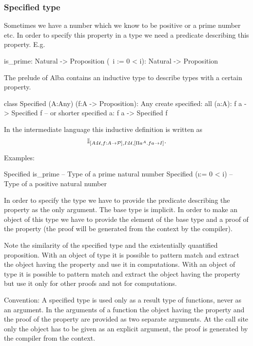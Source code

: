 \subsubsection{Specified type}


Sometimes we have a number which we know to be positive or a prime number
etc. In order to specify this property in a type we need a predicate
describing this property. E.g.

\begin{alba}
  is_prime:       Natural -> Proposition
  (\ i := 0 < i): Natural -> Proposition
\end{alba}

The prelude of Alba contains an inductive type to describe types with a
certain property.

\begin{alba}
  class
    Specified (A:Any) (f:A -> Proposition): Any
  create
    specified: all (a:A): f a -> Specified f
    -- or shorter
    specified a: f a -> Specified f
\end{alba}

In the intermediate language this inductive definition is written as
$$
\mathbb{I}_{[A:{\cal{U}}, f:A \to {\cal{P}}], I:{\cal{U}}, [\Pi a^A . f a \to I]}.
$$

\noindent Examples:
\begin{alba}
  Specified is_prime       -- Type of a prime natural number
  Specified (\i := 0 < i)  -- Type of a positive natural number
\end{alba}

In order to specify the type we have to provide the predicate describing the
property as the only argument. The base type is implicit. In order to make an
object of this type we have to provide the element of the base type and a
proof of the property (the proof will be generated from the context by the
compiler).

Note the similarity of the specified type and the existentially quantified
proposition. With an object of type  it is possible
to pattern match and extract the object having the property and use it in
computations. With an object of type  it is possible to
pattern match and extract the object having the property but use it only for
other proofs and not for computations.

Convention: A specified type is used only as a result type of functions, never
as an argument. In the arguments of a function the object having the property
and the proof of the property are provided as two separate arguments. At the
call site only the object has to be given as an explicit argument, the proof
is generated by the compiler from the context.
\newline





